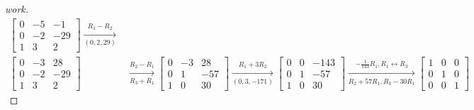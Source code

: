 \documentclass{article}
\begin{document}
\begin{enumerate}
\begin{proof}[work]
\begin{align*}
            \begin{bmatrix}
                0 & -5 & -1  \\
                0 & -2 & -29 \\
                1 & 3  & 2
            \end{bmatrix} \xrightarrow[(0,2,29)]{R_1 - R_2}     \\
            \begin{bmatrix}
                0 & -3 & 28  \\
                0 & -2 & -29 \\
                1 & 3  & 2
            \end{bmatrix} & \xrightarrow[R_3 + R_1]{R_2 - R_1}
            \begin{bmatrix}
                0 & -3 & 28  \\
                0 & 1  & -57 \\
                1 & 0  & 30
            \end{bmatrix} \xrightarrow[(0,3,-171)]{R_1 + 3R_2}
            \begin{bmatrix}
                0 & 0 & -143 \\
                0 & 1 & -57  \\
                1 & 0 & 30
            \end{bmatrix} \xrightarrow[R_2+57R_1,R_3-30R_1]{-\frac{1}{143}R_1, R_1 \leftrightarrow R_3}
            \begin{bmatrix}
                1 & 0 & 0 \\
                0 & 1 & 0 \\
                0 & 0 & 1
            \end{bmatrix}
        \end{align*}
    \end{proof}
\end{enumerate}
\end{document}
